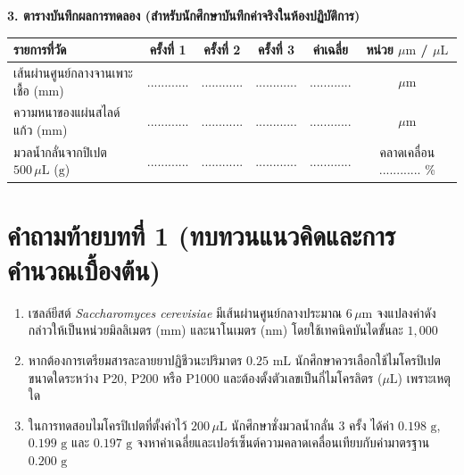 \begin{labbox}
\noindent\textbf{3. ตารางบันทึกผลการทดลอง (สำหรับนักศึกษาบันทึกค่าจริงในห้องปฏิบัติการ)}
\begin{center}
\footnotesize\setlength{\tabcolsep}{3.5pt}
\begin{tabularx}{\linewidth}{>{\raggedright\arraybackslash}X c c c c c}
\toprule
\textbf{รายการที่วัด} & \textbf{ครั้งที่ 1} & \textbf{ครั้งที่ 2} & \textbf{ครั้งที่ 3} & \textbf{ค่าเฉลี่ย} & \textbf{หน่วย $\mu\text{m}$ / $\mu\text{L}$} \\
\midrule
เส้นผ่านศูนย์กลางจานเพาะเชื้อ ($\text{mm}$) & ............ & ............ & ............ & ............ & \dotfill $\mu\text{m}$ \\
ความหนาของแผ่นสไลด์แก้ว ($\text{mm}$) & ............ & ............ & ............ & ............ & \dotfill $\mu\text{m}$ \\
มวลน้ำกลั่นจากปิเปต $500\,\mu\text{L}$ ($\text{g}$) & ............ & ............ & ............ & ............ & คลาดเคลื่อน ............ \% \\
\bottomrule
\end{tabularx}
\end{center}
\end{labbox}

\section*{คำถามท้ายบทที่ 1 (ทบทวนแนวคิดและการคำนวณเบื้องต้น)}
\begin{enumerate}
    \item เซลล์ยีสต์ \textit{Saccharomyces cerevisiae} มีเส้นผ่านศูนย์กลางประมาณ $6\,\mu\text{m}$ จงแปลงค่าดังกล่าวให้เป็นหน่วยมิลลิเมตร ($\text{mm}$) และนาโนเมตร ($\text{nm}$) โดยใช้เทคนิคบันไดขั้นละ $1{,}000$
    \item หากต้องการเตรียมสารละลายยาปฏิชีวนะปริมาตร $0.25\text{ mL}$ นักศึกษาควรเลือกใช้ไมโครปิเปตขนาดใดระหว่าง P20, P200 หรือ P1000 และต้องตั้งตัวเลขเป็นกี่ไมโครลิตร ($\mu\text{L}$) เพราะเหตุใด
    \item ในการทดสอบไมโครปิเปตที่ตั้งค่าไว้ $200\,\mu\text{L}$ นักศึกษาชั่งมวลน้ำกลั่น 3 ครั้ง ได้ค่า $0.198\text{ g}$, $0.199\text{ g}$ และ $0.197\text{ g}$ จงหาค่าเฉลี่ยและเปอร์เซ็นต์ความคลาดเคลื่อนเทียบกับค่ามาตรฐาน $0.200\text{ g}$
\end{enumerate}
